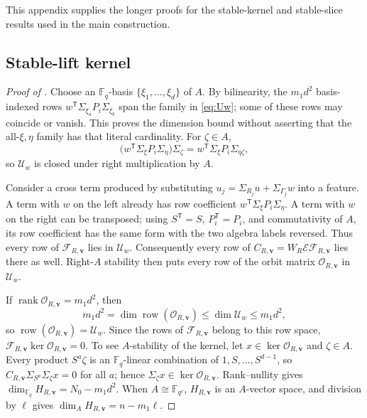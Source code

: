 \documentclass[11pt]{article}
\newcommand{\F}{\mathbb F}
\newcommand{\rank}{\operatorname{rank}}
\newcommand{\transpose}{\mathsf T}
\begin{document}
This appendix supplies the longer proofs for the stable-kernel and
stable-slice results used in the main construction.

\subsection{Stable-lift kernel}\label{app:proof-stable-kernel}

\begin{proof}[Proof of ]
Choose an $\F_q$-basis $\{\xi_1,\ldots,\xi_d\}$ of $A$.  By bilinearity, the
$m_1d^2$ basis-indexed rows
$w^\transpose\Sigma_{\xi_a}P_i\Sigma_{\xi_b}$ span the family in
\eqref{eq:Uw}; some of these rows may coincide or vanish.  This proves the
dimension bound without asserting that the all-$\xi,\eta$ family has that
literal cardinality.  For
$\zeta\in A$,
\[
 \bigl(w^\transpose\Sigma_\xi P_i\Sigma_\eta\bigr)\Sigma_\zeta
 =w^\transpose\Sigma_\xi P_i\Sigma_{\eta\zeta},
\]
so $\mathcal U_w$ is closed under right multiplication by $A$.

Consider a cross term produced by substituting
$u_j=\Sigma_{R_j}u+\Sigma_{\Gamma_j}w$ into a feature.  A term with $w$ on the left
already has row coefficient
$w^\transpose\Sigma_\xi P_i\Sigma_\eta$.  A term with $w$ on the right can be
transposed; using $S^\transpose=S$, $P_i^\transpose=P_i$, and commutativity of
$A$, its row coefficient has the same form with the two algebra labels
reversed.  Thus every row of $\mathcal F_{R,\mathbf v}$ lies in $\mathcal U_w$.
Consequently every row of
$C_{R,\mathbf v}=W_R\mathcal E\mathcal F_{R,\mathbf v}$ lies there as well.  Right-$A$
stability then puts every row of the orbit matrix $\mathcal O_{R,\mathbf v}$ in
$\mathcal U_w$.

If $\rank\mathcal O_{R,\mathbf v}=m_1d^2$, then
\[
 m_1d^2=\dim\operatorname{row}(\mathcal O_{R,\mathbf v})
 \le\dim\mathcal U_w\le m_1d^2,
\]
so $\operatorname{row}(\mathcal O_{R,\mathbf v})=\mathcal U_w$.  Since the rows of
$\mathcal F_{R,\mathbf v}$ belong to this row space,
$\mathcal F_{R,\mathbf v}\ker\mathcal O_{R,\mathbf v}=0$.  To see $A$-stability of the
kernel, let $x\in\ker\mathcal O_{R,\mathbf v}$ and $\zeta\in A$.  Every product
$S^a\zeta$ is an $\F_q$-linear combination of
$1,S,\ldots,S^{d-1}$, so
$C_{R,\mathbf v}\Sigma_{S^a}\Sigma_\zeta x=0$ for all $a$; hence
$\Sigma_\zeta x\in\ker\mathcal O_{R,\mathbf v}$.  Rank--nullity gives
$\dim_{\F_q}H_{R,\mathbf v}=N_0-m_1d^2$.  When $A\cong\F_{q^\ell}$, $H_{R,\mathbf v}$ is an
$A$-vector space, and division by $\ell$ gives
$\dim_A H_{R,\mathbf v}=n-m_1\ell$.
\end{proof}
\end{document}
